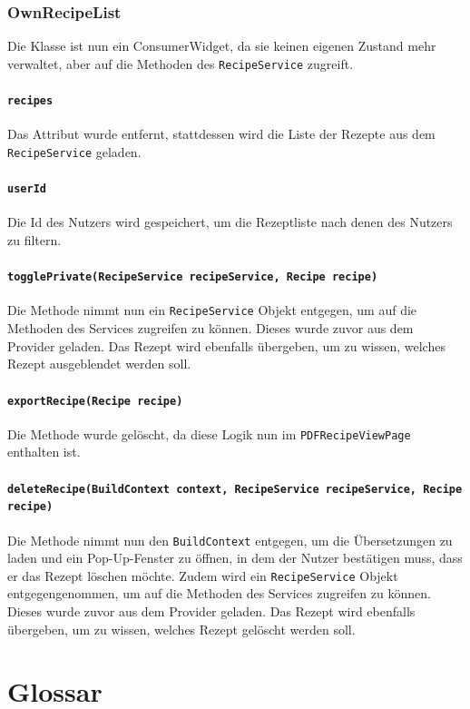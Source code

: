 \documentclass{implementierungsheft}
\begin{document}
\subsubsection*{OwnRecipeList}
Die Klasse ist nun ein ConsumerWidget, da sie keinen eigenen Zustand mehr verwaltet, aber auf die Methoden des \texttt{RecipeService} zugreift.
\paragraph{\texttt{recipes}}
Das Attribut wurde entfernt, stattdessen wird die Liste der Rezepte aus dem \texttt{RecipeService} geladen.
\paragraph{\texttt{userId}}
Die Id des Nutzers wird gespeichert, um die Rezeptliste nach denen des Nutzers zu filtern.
\paragraph{\texttt{togglePrivate(RecipeService recipeService, Recipe recipe)}}
Die Methode nimmt nun ein \texttt{RecipeService} Objekt entgegen, um auf die Methoden des Services zugreifen zu können. Dieses wurde zuvor aus dem Provider geladen. Das Rezept wird ebenfalls übergeben, um zu wissen, welches Rezept ausgeblendet werden soll.
\paragraph{\texttt{exportRecipe(Recipe recipe)}}
Die Methode wurde gelöscht, da diese Logik nun im \texttt{PDFRecipeViewPage} enthalten ist.
\paragraph{\texttt{deleteRecipe(BuildContext context, RecipeService recipeService, Recipe recipe)}}
Die Methode nimmt nun den \texttt{BuildContext} entgegen, um die Übersetzungen zu laden und ein Pop-Up-Fenster zu öffnen, in dem der Nutzer bestätigen muss, dass er das Rezept löschen möchte. Zudem wird ein \texttt{RecipeService} Objekt entgegengenommen, um auf die Methoden des Services zugreifen zu können. Dieses wurde zuvor aus dem Provider geladen. Das Rezept wird ebenfalls übergeben, um zu wissen, welches Rezept gelöscht werden soll.
\section{Glossar}
\printglossary[style=altlist]
\end{document}

